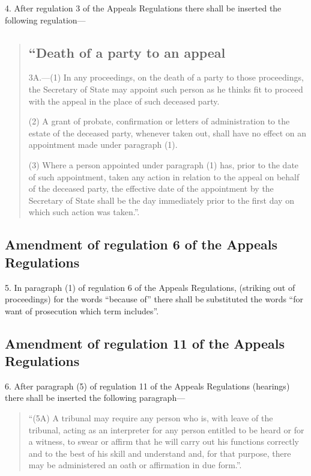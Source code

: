 \documentclass[12pt,a4paper]{article}
\begin{document}
4.  After regulation 3 of the Appeals Regulations there shall be inserted the following regulation—
\begin{quotation}
\subsection*{“Death of a party to an appeal}

3A.—(1) In any proceedings, on the death of a party to those proceedings, the Secretary of State may appoint such person as he thinks fit to proceed with the appeal in the place of such deceased party.

(2) A grant of probate, confirmation or letters of administration to the estate of the deceased party, whenever taken out, shall have no effect on an appointment made under paragraph (1).

(3) Where a person appointed under paragraph (1) has, prior to the date of such appointment, taken any action in relation to the appeal on behalf of the deceased party, the effective date of the appointment by the Secretary of State shall be the day immediately prior to the first day on which such action was taken.”.
\end{quotation}

\subsection[5. Amendment of regulation 6 of the Appeals Regulations]{Amendment of regulation 6 of the Appeals Regulations}

5.  In paragraph (1) of regulation 6 of the Appeals Regulations, (striking out of proceedings) for the words “because of” there shall be substituted the words “for want of prosecution which term includes”.

\subsection[6. Amendment of regulation 11 of the Appeals Regulations]{Amendment of regulation 11 of the Appeals Regulations}

6.  After paragraph (5) of regulation 11 of the Appeals Regulations (hearings) there shall be inserted the following paragraph—
\begin{quotation}
“(5A) A tribunal may require any person who is, with leave of the tribunal, acting as an interpreter for any person entitled to be heard or for a witness, to swear or affirm that he will carry out his functions correctly and to the best of his skill and understand and, for that purpose, there may be administered an oath or affirmation in due form.”.
\end{quotation}
\end{document}
